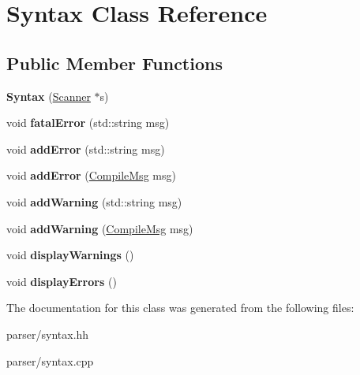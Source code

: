 \hypertarget{classSyntax}{}\section{Syntax Class Reference}
\label{classSyntax}
\subsection*{Public Member Functions}
\begin{DoxyCompactItemize}
\item 
\mbox{\label{classSyntax_ad24775b4df2029b0e9a5ab0bdf7d6e90}} 
{\bfseries Syntax} (\hyperlink{classScanner}{Scanner} $\ast$s)
\item 
\mbox{\label{classSyntax_a054146cfa6cd456df5ebbf6db10f4786}} 
void {\bfseries fatal\+Error} (std\+::string msg)
\item 
\mbox{\label{classSyntax_a3e517c370b46cc8378c4e30c04528941}} 
void {\bfseries add\+Error} (std\+::string msg)
\item 
\mbox{\label{classSyntax_aa8f09d89a0c760e3c1753afea8a57a44}} 
void {\bfseries add\+Error} (\hyperlink{structCompileMsg}{Compile\+Msg} msg)
\item 
\mbox{\label{classSyntax_a1ea674ff58f666ad306e3622cb7df061}} 
void {\bfseries add\+Warning} (std\+::string msg)
\item 
\mbox{\label{classSyntax_af5cbf8ce1e0dc3b6484a8b4278ddf22f}} 
void {\bfseries add\+Warning} (\hyperlink{structCompileMsg}{Compile\+Msg} msg)
\item 
\mbox{\label{classSyntax_a035956ab345a2494a5e1b05132535736}} 
void {\bfseries display\+Warnings} ()
\item 
\mbox{\label{classSyntax_a31b750b3873e4eda0ef68a822796402e}} 
void {\bfseries display\+Errors} ()
\end{DoxyCompactItemize}


The documentation for this class was generated from the following files\+:\begin{DoxyCompactItemize}
\item 
parser/syntax.\+hh\item 
parser/syntax.\+cpp\end{DoxyCompactItemize}
